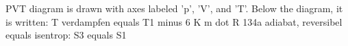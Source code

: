 PVT diagram is drawn with axes labeled 'p', 'V', and 'T'. Below the diagram, it is written:
T verdampfen equals T1 minus 6 K
m dot R 134a
adiabat, reversibel equals isentrop: S3 equals S1